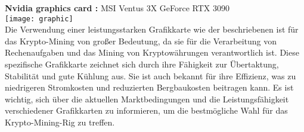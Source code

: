 \documentclass[ngerman]{scrreprt}
\begin{document}
\begin{large}
	\textbf{Nvidia graphics card :} MSI Ventus 3X GeForce RTX 3090
	 \\ 
	\texttt{[image: graphic]}  \\
	Die Verwendung einer leistungsstarken Grafikkarte wie der beschriebenen ist für das Krypto-Mining von großer Bedeutung, da sie für die Verarbeitung von Rechenaufgaben und das Mining von Kryptowährungen verantwortlich ist. Diese spezifische Grafikkarte zeichnet sich durch ihre Fähigkeit zur Übertaktung, Stabilität und gute Kühlung aus. Sie ist auch bekannt für ihre Effizienz, was zu niedrigeren Stromkosten und reduzierten Bergbaukosten beitragen kann. Es ist wichtig, sich über die aktuellen Marktbedingungen und die Leistungsfähigkeit verschiedener Grafikkarten zu informieren, um die bestmögliche Wahl für das Krypto-Mining-Rig zu treffen. \\ 

\end{large}
\end{document}
